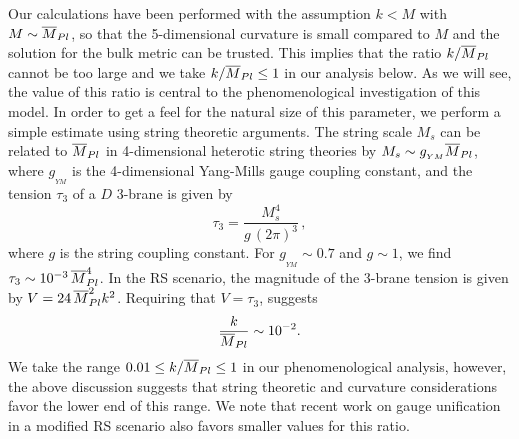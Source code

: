 Our calculations have been performed with the assumption $k < M$ with
$M\sim\mpl$, so that the 5-dimensional curvature is small compared to $M$ 
and the solution for the bulk metric can be trusted\cite{rs1}.  This implies
that the ratio $k/\mpl$ cannot be too large and we take $k/\mpl\leq 1$ in our 
analysis below.  As we will see, the value of this ratio is central to the
phenomenological investigation of this model.  In order to get a feel for the
natural size of this parameter, we perform a simple estimate using string 
theoretic arguments.  The string scale $M_s$ can be related\cite{pol2} to 
$\mpl$ in 4-dimensional heterotic string theories by $M_s\sim g_{_{YM}}\mpl$,
where $g_{_{YM}}$ is the 4-dimensional Yang-Mills gauge coupling constant, 
and the tension $\tau_3$ of a $D$ 3-brane is given by 
\begin{equation}
\tau_3 = \frac{M_s^4}{g\, (2\pi)^3}\,, 
\label{tau3}
\end{equation}
where $g$ is the string coupling constant.  For $g_{_{YM}}\sim 0.7$ and 
$g\sim 1$, we find $\tau_3\sim 10^{- 3}\, \mpl^4$.  
In the RS scenario, the magnitude of the 3-brane tension is given by
$V = 24\, \mpl^2 k^2$.  Requiring that $V = \tau_3$, suggests
\begin{equation}
\frac{k}{\mpl} \sim 10^{- 2}.
\label{kmag}
\end{equation}
We take the range $0.01 \leq k/\mpl \leq 1$ in our phenomenological
analysis, however, the above discussion suggests that string theoretic 
and curvature
considerations favor the lower end of this range.  We note that recent
work\cite{ddg} on gauge unification in a modified RS scenario also favors
smaller values for this ratio.

